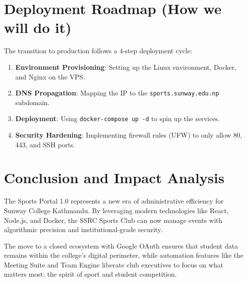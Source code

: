 \documentclass[12pt,a4paper]{article}
\begin{document}
\section{Deployment Roadmap (How we will do it)}

The transition to production follows a 4-step deployment cycle:
\begin{enumerate}
    \item \textbf{Environment Provisioning}: Setting up the Linux environment, Docker, and Nginx on the VPS.
    \item \textbf{DNS Propagation}: Mapping the IP to the \texttt{sports.sunway.edu.np} subdomain.
    \item \textbf{Deployment}: Using \texttt{docker-compose up -d} to spin up the services.
    \item \textbf{Security Hardening}: Implementing firewall rules (UFW) to only allow 80, 443, and SSH ports.
\end{enumerate}

\section{Conclusion and Impact Analysis}

The Sports Portal 1.0 represents a new era of administrative efficiency for Sunway College Kathmandu. By leveraging modern technologies like React, Node.js, and Docker, the SSRC Sports Club can now manage events with algorithmic precision and institutional-grade security. 

The move to a closed ecosystem with Google OAuth ensures that student data remains within the college's digital perimeter, while automation features like the Meeting Suite and Team Engine liberate club executives to focus on what matters most: the spirit of sport and student competition.
\end{document}
